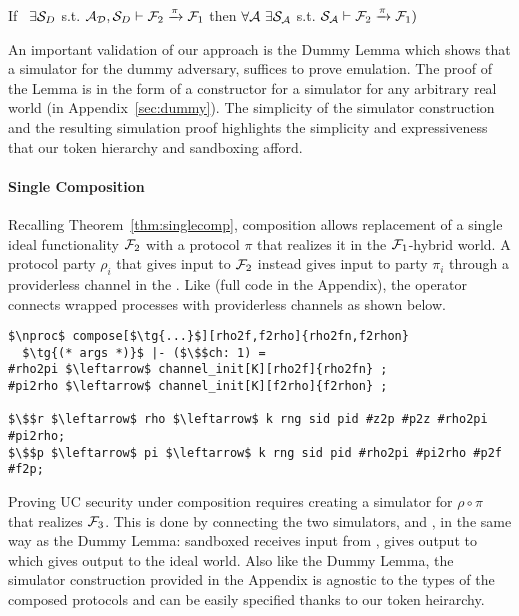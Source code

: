 \begin{theorem}\label{thm:dummythicclemma}
If \ $\exists \mathcal{S}_{D}$ s.t. $ \mathcal{A}_\mathcal{D}, \mathcal{S}_{D} \vdash \mathcal{F}_2 \xrightarrow{\pi} \mathcal{F}_1$ then $\forall \mathcal{A} \ \exists \mathcal{S}_\mathcal{A}$ s.t. $\mathcal{S}_{\mathcal{A}} \vdash  \mathcal{F}_2 \xrightarrow{\pi} \mathcal{F}_1)$ 
\end{theorem}
An important validation of our approach is the Dummy Lemma which shows that a simulator \DS for the dummy adversary, suffices to prove emulation. 
The proof of the Lemma is in the form of a constructor for a simulator for any arbitrary real world \A (in Appendix~\ref{sec:dummy}).
The simplicity of the simulator construction and the resulting simulation proof highlights the
simplicity and expressiveness that our token hierarchy and sandboxing afford. 

\paragraph*{\textbf{Single Composition}}
Recalling Theorem~\ref{thm:singlecomp}, composition allows replacement of a single ideal functionality $\mathcal{F}_2$ with a protocol $\pi$ that realizes it in the $\mathcal{F}_1$-hybrid world. 
A protocol party $\rho_i$ that gives input to $\mathcal{F}_2$ instead gives input to party $\pi_i$ through a providerless channel in the \partywrapper. 
Like  (full code in the Appendix), the operator connects wrapped processes with providerless channels as shown below. 
\begin{lstlisting}[basicstyle=\footnotesize\BeraMonottFamily, mathescape, frame=single]
$\nproc$ compose[$\tg{...}$][rho2f,f2rho]{rho2fn,f2rhon}
  $\tg{(* args *)}$ |- ($\$$ch: 1) = 
#rho2pi $\leftarrow$ channel_init[K][rho2f]{rho2fn} ;
#pi2rho $\leftarrow$ channel_init[K][f2rho]{f2rhon} ;
  
$\$$r $\leftarrow$ rho $\leftarrow$ k rng sid pid #z2p #p2z #rho2pi #pi2rho; 
$\$$p $\leftarrow$ pi $\leftarrow$ k rng sid pid #rho2pi #pi2rho #p2f #f2p;
\end{lstlisting}

Proving UC security under composition requires creating a simulator for $\rho \circ \pi$ that realizes $\mathcal{F}_3$. 
This is done by connecting the two simulators, \SIM{\pi} and \SIM{\rho}, in the same way as the Dummy Lemma: sandboxed \SIM{\pi} receives input from \Z, gives output to \SIM{\rho} which gives output to the ideal world.  
Also like the Dummy Lemma, the simulator construction provided in the Appendix is agnostic to the types of the composed protocols and can be easily specified thanks to our token heirarchy. 


